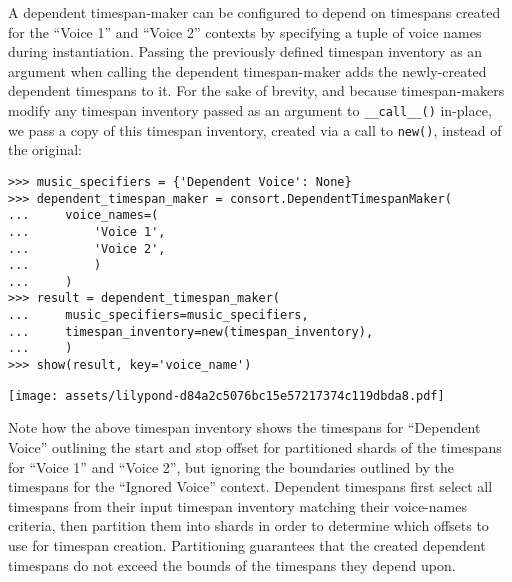 \noindent A dependent timespan-maker can be configured to depend on timespans
created for the \enquote{Voice 1} and \enquote{Voice 2} contexts by specifying
a tuple of voice names during instantiation. Passing the previously defined
timespan inventory as an argument when calling the dependent timespan-maker
adds the newly-created dependent timespans to it. For the sake of brevity, and
because timespan-makers modify any timespan inventory passed as an argument to
\texttt{\_\_call\_\_()} in-place, we pass a copy of this timespan inventory,
created via a call to \texttt{new()}, instead of the original:

\begin{comment}
<abjad>
music_specifiers = {'Dependent Voice': None}
dependent_timespan_maker = consort.DependentTimespanMaker(
    voice_names=(
        'Voice 1',
        'Voice 2',
        )
    )
result = dependent_timespan_maker(
    music_specifiers=music_specifiers,
    timespan_inventory=new(timespan_inventory),
    )
show(result, key='voice_name')
</abjad>
\end{comment}

\begin{singlespacing}
\vspace{-0.5\baselineskip}
\begin{lstlisting}
>>> music_specifiers = {'Dependent Voice': None}
>>> dependent_timespan_maker = consort.DependentTimespanMaker(
...     voice_names=(
...         'Voice 1',
...         'Voice 2',
...         )
...     )
>>> result = dependent_timespan_maker(
...     music_specifiers=music_specifiers,
...     timespan_inventory=new(timespan_inventory),
...     )
>>> show(result, key='voice_name')
\end{lstlisting}
\noindent\texttt{[image: assets/lilypond-d84a2c5076bc15e57217374c119dbda8.pdf]}
\end{singlespacing}

\noindent Note how the above timespan inventory shows the timespans for
\enquote{Dependent Voice} outlining the start and stop offset for partitioned
shards of the timespans for \enquote{Voice 1} and \enquote{Voice 2}, but
ignoring the boundaries outlined by the timespans for the \enquote{Ignored
Voice} context. Dependent timespans first select all timespans from their input
timespan inventory matching their voice-names criteria, then partition them
into shards in order to determine which offsets to use for timespan creation.
Partitioning guarantees that the created dependent timespans do not exceed the
bounds of the timespans they depend upon.

